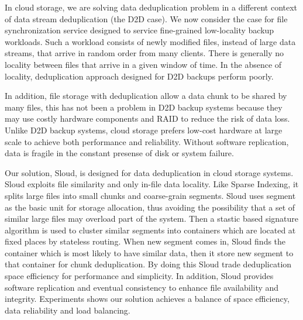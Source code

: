 In cloud storage, we are solving data deduplication problem in a different context of 
data stream deduplication (the D2D case). 
We now consider the case for file synchronization service designed to service fine-grained low-locality backup workloads. 
Such a workload consists of newly modified files, instead of large data streams, that arrive in random order from many clients. 
There is generally no locality between files that arrive in a given window of time. 
In the absence of locality, deduplication approach designed for D2D backups perform poorly.

In addition, file storage with deduplication allow a data chunk to be shared by many files,
this has not been a problem in D2D backup systems because they may use costly hardware components
and RAID to reduce the risk of data loss. Unlike D2D backup systems, cloud storage prefers 
low-cost hardware at large scale to achieve both performance and reliability. Without software
replication, data is fragile in the constant presense of disk or system failure.

Our solution, Sloud, is designed for data deduplication in cloud storage systems. 
Sloud exploits file similarity and only in-file data locality.
Like Sparse Indexing, it splits large files into small chunks and coarse-grain segments.
Sloud uses segment as the basic unit for storage allocation, thus avoiding the possibility that a set of 
similar large files may overload part of the system. 
Then a stastic based signature algorithm is used to cluster similar segments into containers
which are located at fixed places by stateless routing. When new segment comes in, 
Sloud finds the container which is most likely to have similar data, then it store new segment
to that container for chunk deduplication. By doing this Sloud trade deduplication space efficiency
for performance and simplicity. In addition, Sloud provides software replication and eventual consistency
to enhance file availability and integrity.
Experiments shows our solution achieves a balance of space efficiency, data reliability and load balancing.
